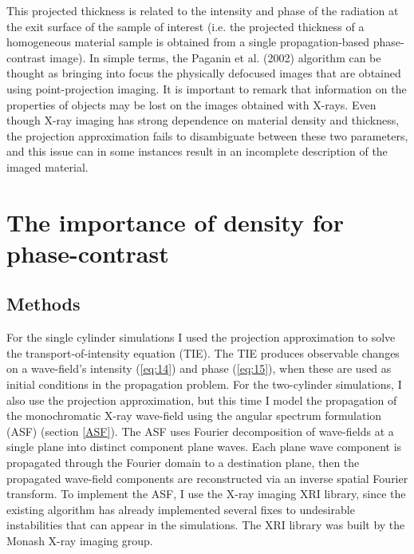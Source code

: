\documentclass[10pt, a4paper, singlespacing]{report}
\begin{document}
This projected thickness is related to the intensity and phase of the radiation at the exit surface of the sample of interest (i.e. the projected thickness of a homogeneous material sample is obtained from a single propagation-based phase-contrast image).
In simple terms, the Paganin et al. (2002) algorithm can be thought as bringing into focus the physically defocused images that are obtained using point-projection imaging\cite{Pags2002}.
It is important to remark that information on the properties of objects may be lost on the images obtained with X-rays. Even though X-ray imaging has strong dependence on material density and thickness\cite{CH49}, the projection approximation fails to disambiguate between these two parameters, and this issue can in some instances result in an incomplete description of the imaged material.

\chapter{The importance of density for phase-contrast}\label{density}

\section{Methods}\label{Methods}

For the single cylinder simulations I used the projection approximation to solve the transport-of-intensity equation (TIE). The TIE produces observable changes on a wave-field's intensity (\ref{eq:14}) and phase (\ref{eq:15}), when these are used as initial conditions in the propagation problem. For the two-cylinder simulations, I also use the projection approximation, but this time I model the propagation of the monochromatic X-ray wave-field using the angular spectrum formulation (ASF) (section \ref{ASF}). The ASF uses Fourier decomposition of wave-fields at a single plane into distinct component plane waves. Each plane wave component is propagated through the Fourier domain to a destination plane, then the propagated wave-field components are reconstructed via an inverse spatial Fourier transform\cite{Goodman}. To implement the ASF, I use the X-ray imaging XRI library, since the existing algorithm has already implemented several fixes to undesirable instabilities that can appear in the simulations. The XRI library was built by the Monash X-ray imaging group.
\end{document}
